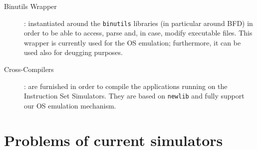 \begin{description}
  \item[Binutils Wrapper]: instantiated around the \texttt{binutils} libraries (in particular around BFD) in order to be able to access, parse and, in case, modify executable files. This wrapper is currently used for the OS emulation; furthermore, it can be used also for deugging purposes.
  \item[Cross-Compilers]: are furnished in order to compile the applications running on the Instruction Set Simulators. They are based on \texttt{newlib} and fully support our OS emulation mechanism.
\end{description}

\section{Problems of current simulators}
\label{intro:problems}
